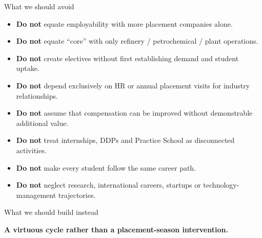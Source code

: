 \documentclass[aspectratio=169,11pt]{beamer}
\newcommand{\key}[1]{\textbf{\color{IITblue}#1}}
\begin{document}
\begin{frame}{What we should avoid}
\begin{itemize}
\item \key{Do not} equate employability with more placement companies alone.
\item \key{Do not} equate ``core'' with only refinery / petrochemical / plant operations.
\item \key{Do not} create electives without first establishing demand and student uptake.
\item \key{Do not} depend exclusively on HR or annual placement visits for industry relationships.
\item \key{Do not} assume that compensation can be improved without demonstrable additional value.
\item \key{Do not} treat internships, DDPs and Practice School as disconnected activities.
\item \key{Do not} make every student follow the same career path.
\item \key{Do not} neglect research, international careers, startups or technology-management trajectories.
\end{itemize}
\end{frame}

\begin{frame}{What we should build instead}
\begin{center}
\end{center}
\vspace{6mm}
\centering\Large\key{A virtuous cycle rather than a placement-season intervention.}
\end{frame}
\end{document}
